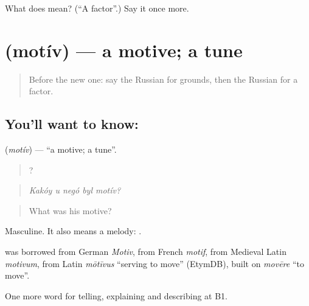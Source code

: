 \begin{tcolorbox}[breakable,colback=teal!4,colframe=teal!35!black,title={Before you move on}]
What does  mean? (\textquotedblleft{}A factor\textquotedblright{}.) Say it once more.
\end{tcolorbox}
\section[\texorpdfstring{\ru{мотив} (motív)}{мотив (motív)}]{ (motív) — a motive; a tune}

\label{lesson:RU-C348-motiv}



\begin{quote}
Before the new one: say the Russian for grounds, then the Russian for a factor.
\end{quote}

\subsection*{You'll want to know: }
\textbf{} (\emph{motív}) — \textquotedblleft{}a motive; a tune\textquotedblright{}.

\begin{quote}
    ?
\end{quote}

\begin{quote}
\emph{Kakóy u negó byl motív?}
\end{quote}

\begin{quote}
What was his motive?
\end{quote}

Masculine. It also means a melody: \emph{ }.

\begin{cousinweb}
\textbf{} was borrowed from German \emph{Motiv}, from French \emph{motif}, from Medieval Latin \emph{motivum}, from Latin \emph{mōtīvus} \textquotedblleft{}serving to move\textquotedblright{} (EtymDB), built on \emph{movēre} \textquotedblleft{}to move\textquotedblright{}.
\end{cousinweb}

\begin{grammarlens}[title={What you've built}]
One more word for telling, explaining and describing at B1.
\end{grammarlens}


